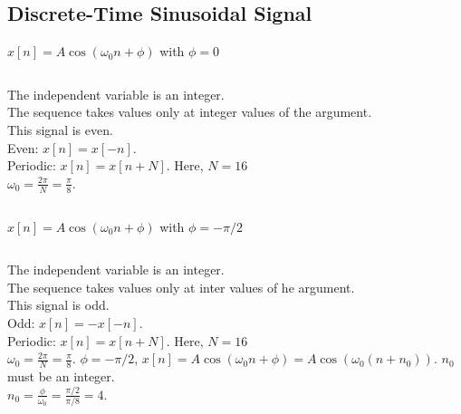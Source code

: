 \subsection{Discrete-Time Sinusoidal Signal}

\begin{frame}[plain]{$x[n] = A\cos(\omega_0n+\phi)$ with $\phi = 0$}
    {
        \begin{columns}[t]
            {
                \centering
                
            }
            {
                The independent variable is an integer.\\
                The sequence takes values only at integer values of the argument.\\
                This signal is \alert{even}. \\[12pt]
                Even: $x[n] = x[-n]$.\\
                Periodic: $x[n] = x[n+N]$. Here, $N=16$\\
                $\omega_0 = \frac{2\pi}{N} = \frac{\pi}{8}$.


            }
        \end{columns}
    }
\end{frame}


\begin{frame}[plain]{$x[n] = A\cos(\omega_0n+\phi)$ with $\phi = -\pi/2$}
    {
        \begin{columns}[t]
            {
                \centering
                
            }
            {
                \noindent The independent variable is an integer.\\
                The sequence takes values only at inter values of he argument.\\
                This signal is \alert{odd}. \\[12pt]
                Odd: $x[n] = -x[-n]$.\\
                Periodic: $x[n] = x[n+N]$. Here, $N=16$\\
                $\omega_0 = \frac{2\pi}{N} = \frac{\pi}{8}$.
                $\phi= -\pi/2$, $x[n] = A\cos(\omega_0n+\phi) = A\cos(\omega_0(n+n_0))$. $n_0$ must be an integer.\\
                $n_0 = \frac{\phi}{\omega_0} = \frac{\pi/2}{\pi/8} = 4$.


            }
        \end{columns}
    }
\end{frame}




